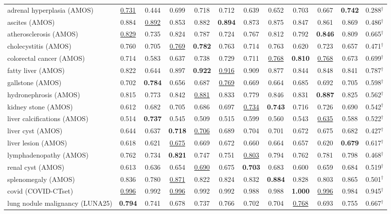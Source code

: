 \begin{minipage}{\textwidth}
{\begin{tabular}{@{}lccccccccccc@{}}
adrenal hyperplasia (AMOS) & \underline{0.731} & 0.444 & 0.699 & 0.718 & 0.712 & 0.639 & 0.652 & 0.703 & 0.667 & \textbf{0.742} & 0.288$^{\dagger}$ \\
ascites (AMOS) & 0.884 & \underline{0.892} & 0.853 & 0.882 & \textbf{0.894} & 0.873 & 0.875 & 0.847 & 0.861 & 0.869 & 0.486$^{\dagger}$ \\
atherosclerosis (AMOS) & \underline{0.829} & 0.735 & 0.824 & 0.787 & 0.724 & 0.767 & 0.812 & 0.792 & \textbf{0.846} & 0.809 & 0.665$^{\dagger}$ \\
cholecystitis (AMOS) & 0.760 & 0.705 & \underline{0.769} & \textbf{0.782} & 0.763 & 0.714 & 0.763 & 0.620 & 0.723 & 0.657 & 0.471$^{\dagger}$ \\
colorectal cancer (AMOS) & 0.714 & 0.583 & 0.637 & 0.738 & 0.729 & 0.711 & \underline{0.768} & \textbf{0.810} & \underline{0.768} & 0.673 & 0.699$^{\dagger}$ \\
fatty liver (AMOS) & 0.822 & 0.644 & 0.897 & \textbf{0.922} & \underline{0.916} & 0.909 & 0.877 & 0.844 & 0.848 & 0.841 & 0.787$^{\dagger}$ \\
gallstone (AMOS) & 0.702 & \textbf{0.784} & 0.656 & 0.687 & \underline{0.769} & 0.669 & 0.664 & 0.685 & 0.692 & 0.705 & 0.598$^{\dagger}$ \\
hydronephrosis (AMOS) & 0.815 & 0.773 & 0.842 & \underline{0.881} & 0.833 & 0.779 & 0.846 & 0.831 & \textbf{0.887} & 0.825 & 0.562$^{\dagger}$ \\
kidney stone (AMOS) & 0.612 & 0.682 & 0.705 & 0.686 & 0.697 & \underline{0.734} & \textbf{0.743} & 0.716 & 0.726 & 0.690 & 0.542$^{\dagger}$ \\
liver calcifications (AMOS) & 0.514 & \textbf{0.737} & 0.545 & 0.509 & 0.515 & 0.599 & 0.560 & 0.543 & \underline{0.635} & 0.588 & 0.522$^{\dagger}$ \\
liver cyst (AMOS) & 0.644 & 0.637 & \textbf{0.718} & \underline{0.706} & 0.689 & 0.704 & 0.701 & 0.672 & 0.675 & 0.682 & 0.427$^{\dagger}$ \\
liver lesion (AMOS) & 0.618 & 0.621 & \underline{0.675} & 0.669 & 0.672 & 0.660 & 0.664 & 0.657 & 0.620 & \textbf{0.679} & 0.617$^{\dagger}$ \\
lymphadenopathy (AMOS) & 0.762 & 0.734 & \textbf{0.821} & 0.747 & 0.751 & \underline{0.803} & 0.794 & 0.762 & 0.781 & 0.798 & 0.468$^{\dagger}$ \\
renal cyst (AMOS) & 0.613 & 0.636 & 0.654 & \underline{0.690} & 0.675 & \textbf{0.703} & 0.683 & 0.600 & 0.659 & 0.684 & 0.519$^{\dagger}$ \\
splenomegaly (AMOS) & 0.836 & 0.780 & \underline{0.871} & 0.822 & 0.824 & 0.832 & \textbf{0.884} & 0.828 & 0.803 & 0.865 & 0.501$^{\dagger}$ \\
covid (COVID-CTset) & \underline{0.996} & 0.992 & \underline{0.996} & 0.992 & 0.992 & 0.988 & 0.988 & \textbf{1.000} & \underline{0.996} & 0.984 & 0.945$^{\dagger}$ \\
lung nodule malignancy (LUNA25) & \textbf{0.794} & 0.741 & 0.678 & 0.737 & 0.766 & 0.702 & 0.704 & \underline{0.768} & 0.693 & 0.755 & 0.667$^{\dagger}$ \\
\bottomrule
\end{tabular}
}\end{minipage}
